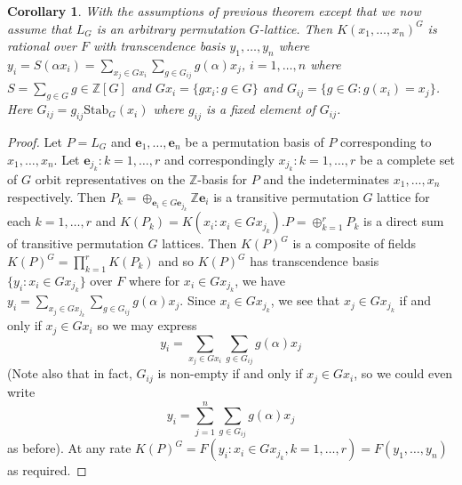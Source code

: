 \documentclass{article}
\theoremstyle{plain}
\newtheorem{corollary}[theorem]{Corollary}
\theoremstyle{definition}
\newcommand{\Z}{\ensuremath{\mathbb{Z}}}
\begin{document}
\begin{corollary}\label{ConstructiveNoNameLemma}
With the assumptions of previous theorem except that we now assume that $L_G$ is an arbitrary permutation $G$-lattice. Then $ K(x_1,\ldots , x_n)^G$ is rational over $F$ with transcendence basis $y_1, \ldots , y_n$ where $y_i = S(\alpha x_i) = \sum_{x_j \in Gx_i}\sum_{g \in G_{ij}}g(\alpha)x_j$, $i = 1, \ldots , n$ where $S = \sum_{g\in G} g \in \Z[G]$ and $Gx_i = \lbrace gx_i : g \in G \rbrace$  and  $G_{ij} = \lbrace g \in G : g(x_i) = x_j \rbrace$. Here $G_{ij}=g_{ij}\mathrm{Stab}_{G}(x_i)$ where $g_{ij}$ is a fixed element of $G_{ij}$. 
\end{corollary}
\begin{proof}
Let $P = L_G$ and $\textbf{e}_1, \ldots , \textbf{e}_n$ be a permutation basis of $P$ corresponding to $x_1, \ldots, x_n$. Let $\textbf{e}_{j_k}: k = 1, \ldots, r$ and correspondingly $x_{j_k}: k = 1, \ldots, r$ be a complete set of $G$ orbit representatives on the $\Z$-basis for $P$ and the indeterminates $x_1, \ldots, x_n$ respectively. Then $P_k = \oplus_{ \textbf{e}_i \in G \textbf{e}_{j_{k}} } \Z \textbf{e}_i$ is a transitive permutation $G$ lattice for each $k = 1, \ldots , r$ and $K(P_k) = K(x_i : x_i \in Gx_{j_k})$.$P = \oplus^r_{k =1} P_k$ is a direct sum of transitive permutation $G$ lattices. Then $K(P)^G$ is a composite of fields $K(P)^G = \prod^r_{k =1}K(P_k)$ and so $K(P)^G$ has transcendence basis $\lbrace y_i: x_i \in Gx_{j_k}\rbrace$ over $F$ where for $x_i \in Gx_{j_k}$, we have $y_i = \sum_{x_j \in Gx_{j_k}}\sum_{g \in G_{ij}}g(\alpha)x_j$. Since $x_i \in Gx_{j_k}$, we see that $x_j \in Gx_{j_k}$ if and only if $x_j \in Gx_i$ so we may express
$$y_i = \sum_{x_j \in Gx_i}\sum_{g \in G_{ij}}g(\alpha)x_j$$ 
(Note also that in fact, $G_{ij}$ is non-empty if and only if $x_j \in Gx_i$, so we could even write 
$$y_i = \sum^n_{j=1}\sum_{g \in G_{ij}}g(\alpha)x_j$$
as before). At any rate $K(P)^G = F(y_i : x_i \in Gx_{j_k}, k = 1, \ldots,r) = F(y_1, \ldots,y_n)$ as required.

\end{proof}
\end{document}
